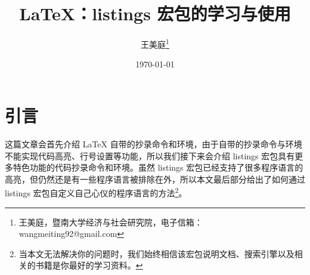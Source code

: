 \documentclass[UTF8,hyperref]{ctexart}
\title{LaTeX：listings 宏包的学习与使用}
\author{王美庭\thanks{王美庭，暨南大学经济与社会研究院，电子信箱：wangmeiting92@gmail.com}} %
\date{\today}
\begin{document}
\maketitle

\tableofcontents

\thispagestyle{empty}

\newpage

\setcounter{page}{1}

\section{引言}
这篇文章会首先介绍 LaTeX 自带的抄录命令和环境，由于自带的抄录命令与环境不能实现代码高亮、行号设置等功能，所以我们接下来会介绍 listings 宏包具有更多特色功能的代码抄录命令和环境。虽然 listings 宏包已经支持了很多程序语言的高亮，但仍然还是有一些程序语言被排除在外，所以本文最后部分给出了如何通过 listings 宏包自定义自己心仪的程序语言的方法\footnote{当本文无法解决你的问题时，我们始终相信该宏包说明文档、搜索引擎以及相关的书籍是你最好的学习资料。}。
\end{document}
